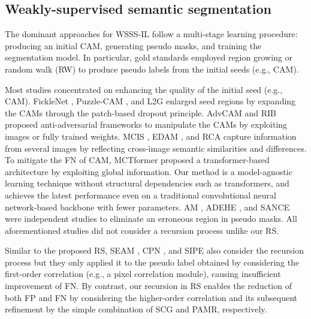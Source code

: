 \documentclass[11pt]{article}
\begin{document}
\subsection{Weakly-supervised semantic segmentation}

The dominant approaches for WSSS-IL follow a multi-stage learning procedure: producing an initial CAM, generating pseudo masks, and training the segmentation model. In particular, gold standards employed region growing \cite{kolesnikov2016seed,huang2018weakly} or random walk (RW) \cite{ahn2018learning,ahn2019weakly} to produce pseudo labels from the initial seeds (e.g., CAM).

Most studies \cite{lee2019ficklenet, jiang2022l2g, lee2021reducing, wu2021embedded, xie2022clims, du2022weakly, lee2022threshold} concentrated on enhancing the quality of the initial seed (e.g., CAM). FickleNet \cite{lee2019ficklenet}, Puzzle-CAM \cite{jo2021puzzle}, and L2G \cite{jiang2022l2g} enlarged seed regions by expanding the CAMs through the patch-based dropout principle. AdvCAM \cite{lee2021anti} and RIB \cite{lee2021reducing} proposed anti-adversarial frameworks to manipulate the CAMs by exploiting images or fully trained weights. MCIS \cite{sun2020mining}, EDAM \cite{wu2021embedded}, and RCA \cite{zhou2022regional} capture information from several images by reflecting cross-image semantic similarities and differences. {To mitigate the FN of CAM, MCTformer \cite{xu2022multi} proposed a transformer-based architecture by exploiting global information. {Our method is a model-agnostic learning technique without structural dependencies such as transformers, and achieves the latest performance even on a traditional convolutional neural network-based backbone with fewer parameters.} AM \cite{xie2022c2am}, ADEHE \cite{liu2022adaptive}, and SANCE \cite{li2022towards} were independent studies to eliminate an erroneous region in pseudo masks. All aforementioned studies did not consider a recursion process unlike our RS.}






{Similar to the proposed RS, SEAM \cite{wang2020self}, CPN \cite{zhang2021complementary}, and SIPE \cite{chen2022self} also consider the recursion process but they only applied it to the pseudo label obtained by considering the first-order correlation (e.g., a pixel correlation module), causing insufficient improvement of FN. By contrast, our recursion in RS enables the reduction of both FP and FN by considering the higher-order correlation and its subsequent refinement by the simple combination of SCG and PAMR, respectively.}
\end{document}
